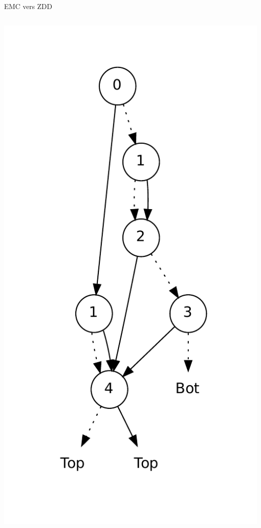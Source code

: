 \documentclass{beamer}
\begin{document}
\begin{frame}{EMC vers ZDD}
\begin{columns}
    \includegraphics[height=0.9\textheight]{imports/column.pdf}
  \end{columns}
\end{frame}
\end{document}
